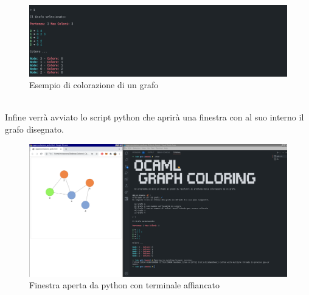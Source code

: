 \begin{figure}[H]
	\centering
	\includegraphics[width=\textwidth]{img/grafo1bin.png}
	\caption{Esempio di colorazione di un grafo}
\end{figure}
\ \\
Infine verrà avviato lo script python che aprirà una finestra con al suo interno il grafo disegnato.

\begin{figure}[H]
	\centering
	\includegraphics[width=\textwidth]{img/termgrafo.png}
	\caption{Finestra aperta da python con terminale affiancato}
\end{figure}